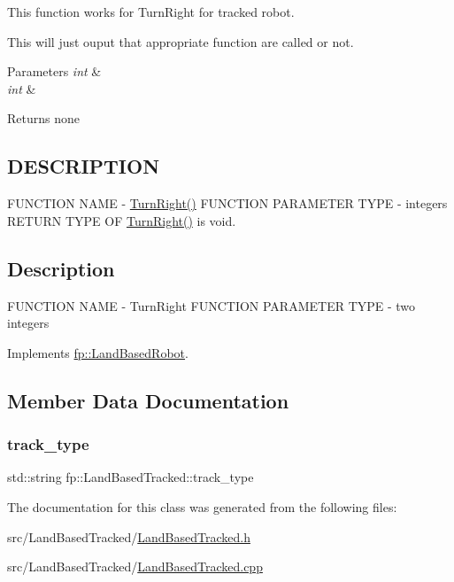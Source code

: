 This function works for Turn\+Right for tracked robot. 

This will just ouput that appropriate function are called or not.


\begin{DoxyParams}{Parameters}
{\em int} & \\
\hline
{\em int} & \\
\hline
\end{DoxyParams}
\begin{DoxyReturn}{Returns}
none 
\end{DoxyReturn}
\hypertarget{_m_a_z_e_8h_DESCRIPTION}{}\subsection{D\+E\+S\+C\+R\+I\+P\+T\+I\+ON}\label{_m_a_z_e_8h_DESCRIPTION}
F\+U\+N\+C\+T\+I\+ON N\+A\+ME -\/ \hyperlink{classfp_1_1_land_based_tracked_a619c29950f6c484d3481e31ff01dad3a}{Turn\+Right()} F\+U\+N\+C\+T\+I\+ON P\+A\+R\+A\+M\+E\+T\+ER T\+Y\+PE -\/ integers R\+E\+T\+U\+RN T\+Y\+PE OF \hyperlink{classfp_1_1_land_based_tracked_a619c29950f6c484d3481e31ff01dad3a}{Turn\+Right()} is void.\hypertarget{main_8cpp_Description}{}\subsection{Description}\label{main_8cpp_Description}
F\+U\+N\+C\+T\+I\+ON N\+A\+ME -\/ Turn\+Right F\+U\+N\+C\+T\+I\+ON P\+A\+R\+A\+M\+E\+T\+ER T\+Y\+PE -\/ two integers 

Implements \hyperlink{classfp_1_1_land_based_robot_a7360e4084bc5254f72ab0d3612644907}{fp\+::\+Land\+Based\+Robot}.



\subsection{Member Data Documentation}
\mbox{\label{classfp_1_1_land_based_tracked_a89923d6f493b1581a882f531ed6de3ea}} 
\subsubsection{\texorpdfstring{track\+\_\+type}{track\_type}}
{\footnotesize\ttfamily std\+::string fp\+::\+Land\+Based\+Tracked\+::track\+\_\+type\hspace{0.3cm}{\ttfamily [protected]}}



The documentation for this class was generated from the following files\+:\begin{DoxyCompactItemize}
\item 
src/\+Land\+Based\+Tracked/\hyperlink{_land_based_tracked_8h}{Land\+Based\+Tracked.\+h}\item 
src/\+Land\+Based\+Tracked/\hyperlink{_land_based_tracked_8cpp}{Land\+Based\+Tracked.\+cpp}\end{DoxyCompactItemize}
